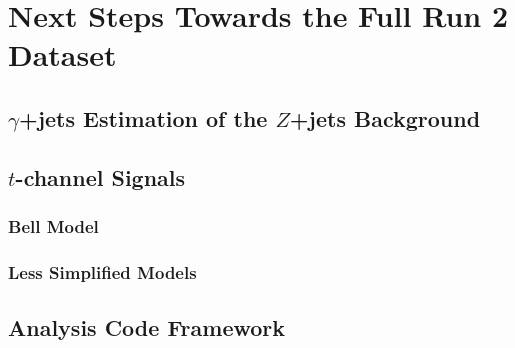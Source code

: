 \chapter{Next Steps Towards the Full Run 2 Dataset}

\section{$\gamma$+jets Estimation of the $Z$+jets Background}


\section{$t$-channel Signals}

\subsection{Bell Model}

\subsection{Less Simplified Models}

\section{Analysis Code Framework}
